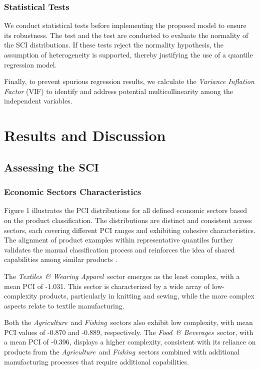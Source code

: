 \documentclass[10pt]{article}
\newcommand{\AG}{\textit{Agriculture}}
\newcommand{\FI}{\textit{Fishing}}
\newcommand{\FO}{\textit{Food~\& Beverages}}
\newcommand{\TE}{\textit{Textiles~\& Wearing Apparel}}
\begin{document}
\subsubsection{Statistical Tests}
We conduct statistical tests before implementing the proposed model to ensure its robustness. The \cite{ShapiroWilk} test and the \cite{ADFTest} test are conducted to evaluate the normality of the SCI distributions. If these tests reject the normality hypothesis, the assumption of heterogeneity is supported, thereby justifying the use of a quantile regression model.

Finally, to prevent spurious regression results, we calculate the \textit{Variance Inflation Factor} (VIF) \citep{VIF} to identify and address potential multicollinearity among the independent variables.


\section{Results and Discussion}

\subsection{Assessing the SCI}

\subsubsection{Economic Sectors Characteristics}
\label{sec:economic-sectors}
Figure 1 illustrates the PCI distributions for all defined economic sectors based on the product classification. The distributions are distinct and consistent across sectors, each covering different PCI ranges and exhibiting cohesive characteristics. The alignment of product examples within representative quantiles further validates the manual classification process and reinforces the idea of shared capabilities among similar products \citep{hidalgoProductSpaceConditions2007}.

The \TE\ sector emerges as the least complex, with a mean PCI of -1.031. This sector is characterized by a wide array of low-complexity products, particularly in knitting and sewing, while the more complex aspects relate to textile manufacturing.

Both the \AG\ and \FI\ sectors also exhibit low complexity, with mean PCI values of -0.870 and -0.889, respectively. The \FO\ sector, with a mean PCI of -0.396, displays a higher complexity, consistent with its reliance on products from the \AG\ and \FI\ sectors combined with additional manufacturing processes that require additional capabilities.
\end{document}
